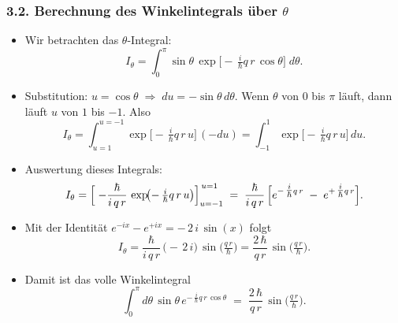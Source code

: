 \documentclass{scrartcl}
\begin{document}
\subsubsection*{3.2. Berechnung des Winkelintegrals über $\theta$}
\begin{itemize}
  \item Wir betrachten das $\theta$-Integral:
  \[
    I_{\theta}
    = 
    \int_{0}^{\pi}\!\sin\theta\,
    \exp\!\bigl[-\,\tfrac{i}{\hbar}q\,r\,\cos\theta\bigr]\;d\theta.
  \]
  \item Substitution: $u = \cos\theta \;\Rightarrow\; du = -\sin\theta\,d\theta$. Wenn $\theta$ von $0$ bis $\pi$ läuft, dann läuft $u$ von $1$ bis $-1$. Also
  \[
    I_{\theta}
    = 
    \int_{u=1}^{u=-1}
    \exp\!\bigl[-\,\tfrac{i}{\hbar}q\,r\,u\bigr]\,(-du)
    = 
    \int_{-1}^{1} \exp\!\bigl[-\,\tfrac{i}{\hbar}q\,r\,u\bigr]\,du.
  \]
  \item Auswertung dieses Integrals:
  \[
    I_{\theta}
    = 
    \Bigl[\;-\frac{\hbar}{i\,q\,r}\,
    \exp\!\bigl(-\,\tfrac{i}{\hbar}q\,r\,u\bigr)\Bigr]_{u=-1}^{\,u=1}
    \;=\;
    \frac{\hbar}{i\,q\,r}\,
    \Bigl[e^{-\,\tfrac{i}{\hbar}q\,r} \;-\; e^{+\,\tfrac{i}{\hbar}q\,r}\Bigr].
  \]
  \item Mit der Identität $e^{-ix}-e^{+ix} = -\,2\,i\,\sin(x)$ folgt
  \[
    I_{\theta}
    = 
    \frac{\hbar}{i\,q\,r}\,\bigl(-\,2\,i\bigr)\,
    \sin\!\bigl(\tfrac{q\,r}{\hbar}\bigr)
    = 
    \frac{2\,\hbar}{q\,r}\,
    \sin\!\bigl(\tfrac{q\,r}{\hbar}\bigr).
  \]
  \item Damit ist das volle Winkelintegral
  \[
    \int_{0}^{\pi}d\theta\,\sin\theta\,
    e^{-\,\tfrac{i}{\hbar}q\,r\,\cos\theta}
    \;=\;
    \frac{2\,\hbar}{q\,r}\,
    \sin\!\bigl(\tfrac{q\,r}{\hbar}\bigr).
  \]
\end{itemize}
\end{document}
